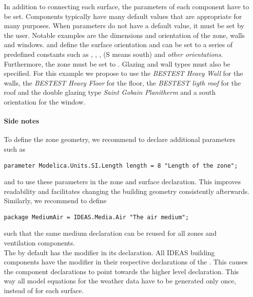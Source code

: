 \documentclass[10pt,a4paper]{article}
\begin{document}
In addition to connecting each surface, the parameters of each component have to be set. 
Components typically have many default values that are appropriate for many purposes.
When parameters do not have a default value, it must be set by the user. 
Notable examples are the dimensions and orientation of the zone, walls and windows. 
 and  define the surface orientation and can be set to a series of predefined constants such as , , ,  (S means south) and \textit{other orientations}.
Furthermore, the zone  must be set to .
Glazing and wall types must also be specified.
For this example we propose to use the \textit{BESTEST Heavy Wall} for the walls, the \textit{BESTEST Heavy Floor} for the floor, the \textit{BESTEST ligth roof} for the roof
and the double glazing type \textit{Saint Gobain Planitherm} and a south orientation for the window.

\paragraph{Side notes}
To define the zone geometry, 
we recommend to declare additional parameters such as
\begin{verbatim}
parameter Modelica.Units.SI.Length length = 8 "Length of the zone";
\end{verbatim}
and to use these parameters in the zone and surface declaration. 
This improves readability and facilitates changing the building geometry consistently afterwards.\\

Similarly, we recommend to define
\begin{verbatim}
package MediumAir = IDEAS.Media.Air "The air medium";
\end{verbatim}
such that the same medium declaration can be reused for all zones and ventilation components.\\

The  by default has the modifier  in its declaration. 
All IDEAS building components have the modifier  in their respective 
declarations of the . 
This causes the component declarations to point towards the higher level 
declaration. This way all model equations for the weather data have to be generated only once,
instead of for each surface.\\
\end{document}

